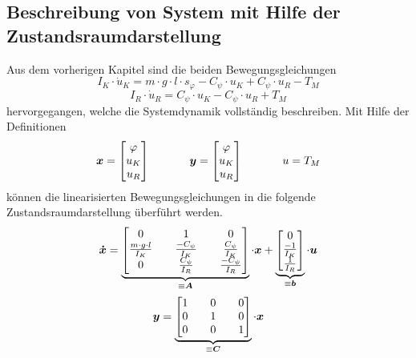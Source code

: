 \subsection{Beschreibung von System mit Hilfe der Zustandsraumdarstellung}
Aus dem vorherigen Kapitel sind die beiden Bewegungsgleichungen 
\begin{equation}
I_K \cdot \dot{u}_K = m\cdot g\cdot l\cdot s_{\varphi} - C_{\psi}\cdot u_{K} + C_{\psi} \cdot u_{R} - T_M
\end{equation}
\begin{equation}
I_R\cdot \dot{u}_R = C_{\psi}\cdot u_{K} - C_{\psi}\cdot u_{R} + T_M
\end{equation}
hervorgegangen, welche die Systemdynamik vollständig beschreiben. Mit Hilfe der Definitionen
\begin{equation}
\boldsymbol{x} = \begin{bmatrix} \varphi \\ u_K \\ u_R \end{bmatrix}
\hspace{35pt}
\boldsymbol{y} = \begin{bmatrix} \varphi \\ u_K \\ u_R \end{bmatrix}
\hspace{35pt}
u = T_M
\end{equation}
können die linearisierten Bewegungsgleichungen in die folgende Zustandsraumdarstellung überführt werden.
\begin{equation}
\boldsymbol{\dot{x}} = \underbrace{\begin{bmatrix}
0 && 1 && 0 
\\ 
\frac{m\cdot g\cdot l}{I_K} && \frac{-C_{\psi}}{I_K} && \frac{C_{\psi}}{I_K}
\\
0 && \frac{C_{\psi}}{I_R} && \frac{-C_{\psi}}{I_R}
\end{bmatrix}}_{\equiv \boldsymbol{A}} \cdot \boldsymbol{x}
+
\underbrace{\begin{bmatrix}
0 \\ \frac{-1}{I_K} \\ \frac{1}{I_R}
\end{bmatrix}}_{\equiv \boldsymbol{b}} \cdot \boldsymbol{u}
\end{equation}
\begin{equation}
\boldsymbol{y} = \underbrace{\begin{bmatrix}
1 && 0 && 0 \\ 0 && 1 && 0 \\ 0 && 0 && 1
\end{bmatrix}}_{\equiv \boldsymbol{C}} \cdot \boldsymbol{x}
\end{equation}
